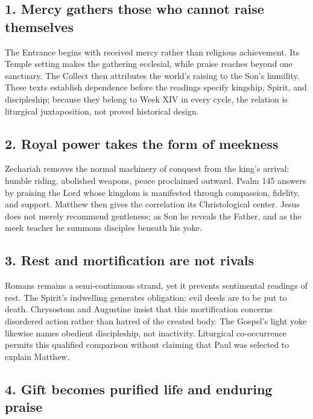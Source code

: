 \begin{deepstudy}
\subsection*{1. Mercy gathers those who cannot raise themselves\enspace{}}

The Entrance begins with received mercy rather than religious achievement. Its Temple setting makes the gathering ecclesial, while praise reaches beyond one sanctuary. The Collect then attributes the world's raising to the Son's humility. These texts establish dependence before the readings specify kingship, Spirit, and discipleship; because they belong to Week XIV in every cycle, the relation is liturgical juxtaposition, not proved historical design.

\subsection*{2. Royal power takes the form of meekness\enspace{}}

Zechariah removes the normal machinery of conquest from the king's arrival: humble riding, abolished weapons, peace proclaimed outward. Psalm 145 answers by praising the Lord whose kingdom is manifested through compassion, fidelity, and support. Matthew then gives the correlation its Christological center. Jesus does not merely recommend gentleness; as Son he reveals the Father, and as the meek teacher he summons disciples beneath his yoke.

\subsection*{3. Rest and mortification are not rivals\enspace{}}

Romans remains a semi-continuous strand, yet it prevents sentimental readings of rest. The Spirit's indwelling generates obligation: evil deeds are to be put to death. Chrysostom and Augustine insist that this mortification concerns disordered action rather than hatred of the created body. The Gospel's light yoke likewise names obedient discipleship, not inactivity. Liturgical co-occurrence permits this qualified comparison without claiming that Paul was selected to explain Matthew.

\subsection*{4. Gift becomes purified life and enduring praise\enspace{}}


\end{deepstudy}
